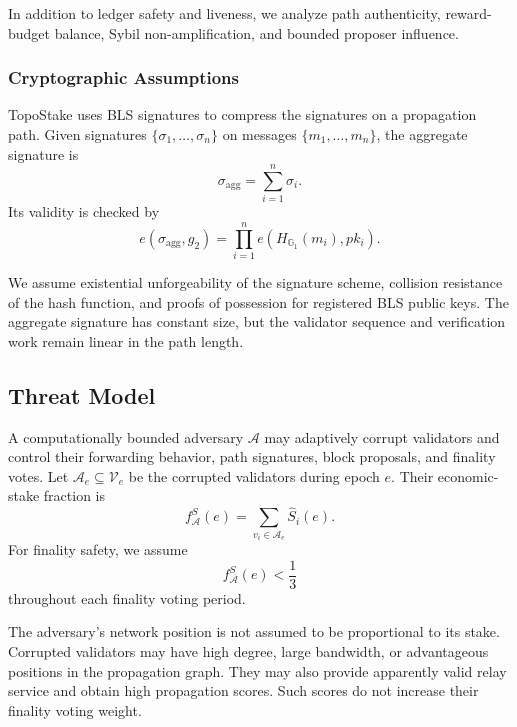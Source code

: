 \documentclass[lettersize,journal]{IEEEtran}
\begin{document}
In addition to ledger safety and liveness, we analyze path authenticity, reward-budget balance, Sybil non-amplification, and bounded proposer influence.

\subsubsection{Cryptographic Assumptions}

TopoStake uses BLS signatures to compress the signatures on a propagation path.
Given signatures $\{\sigma_1,\dots,\sigma_n\}$ on messages
$\{m_1,\dots,m_n\}$, the aggregate signature is
\begin{equation}
\sigma_{\mathrm{agg}}
=
\sum_{i=1}^{n}\sigma_i.
\end{equation}
Its validity is checked by
\begin{equation}
e(\sigma_{\mathrm{agg}},g_2)
=
\prod_{i=1}^{n}
e\!\left(
H_{\mathbb{G}_1}(m_i),pk_i
\right).
\end{equation}

We assume existential unforgeability of the signature scheme,
collision resistance of the hash function,
and proofs of possession for registered BLS public keys.
The aggregate signature has constant size, but the validator sequence and verification work remain linear in the path length.


\subsection{Threat Model}
\label{subsec:problem_threat}

A computationally bounded adversary $\mathcal{A}$ may adaptively corrupt validators and control their forwarding behavior, path signatures, block proposals, and finality votes.
Let $\mathcal{A}_e\subseteq\mathcal{V}_e$ be the corrupted validators during epoch $e$.
Their economic-stake fraction is
\begin{equation}
\label{eq:adversarial_stake_fraction}
f_{\mathcal{A}}^{S}(e)
=
\sum_{v_i\in\mathcal{A}_e}
\hat S_i(e).
\end{equation}
For finality safety, we assume
\begin{equation}
\label{eq:real_stake_assumption}
f_{\mathcal{A}}^{S}(e)
<
\frac{1}{3}
\end{equation}
throughout each finality voting period.

The adversary's network position is not assumed to be proportional to its stake.
Corrupted validators may have high degree, large bandwidth, or advantageous positions in the propagation graph.
They may also provide apparently valid relay service and obtain high propagation scores.
Such scores do not increase their finality voting weight.
\end{document}
